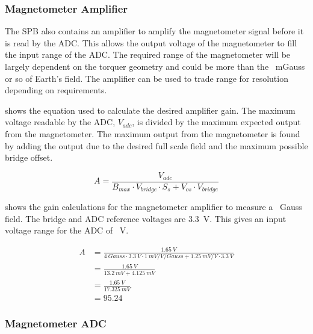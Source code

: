 \subsubsection{Magnetometer Amplifier}

The \ac{SPB} also contains an amplifier to amplify the magnetometer signal before it is read by the \ac{ADC}. This allows the output voltage of the magnetometer to fill the input range of the \ac{ADC}. The required range of the magnetometer will be largely dependent on the torquer geometry and could be more than the ~mGauss or so of Earth's field. The amplifier can be used to trade range for resolution depending on requirements.

 shows the equation used to calculate the desired amplifier gain. The maximum voltage readable by the \ac{ADC}, $V_{adc}$, is divided by the maximum expected output from the magnetometer. The maximum output from the magnetometer is found by adding the output due to the desired full scale field and the maximum possible bridge offset.

\begin{equation}
    \label{eq:amp-gain}
    A = \frac{V_{adc}}{B_{max} \cdot V_{bridge} \cdot S_s + V_{os} \cdot V_{bridge}}
\end{equation}

 shows the gain calculations for the magnetometer amplifier to measure a ~Gauss field. The bridge and \ac{ADC} reference voltages are 3.3~V. This gives an input voltage range for the \ac{ADC} of ~V.

\begin{equation}
    \label{eq:amp-gain-calc}
    \begin{split}
        A &= \frac{1.65~\unit{V}}{4~\unit{Gauss} \cdot 3.3~\unit{V} \cdot 1~\unit{mV/V/Gauss} + 1.25~\unit{mV/V} \cdot 3.3~\unit{V}}\\ 
          &= \frac{1.65~\unit{V}}{13.2~\unit{mV} + 4.125~\unit{mV}} \\
          &= \frac{1.65~\unit{V}}{17.325~\unit{mV}} \\
          &= 95.24
    \end{split}
\end{equation}


\subsubsection{Magnetometer \acl*{ADC}}

